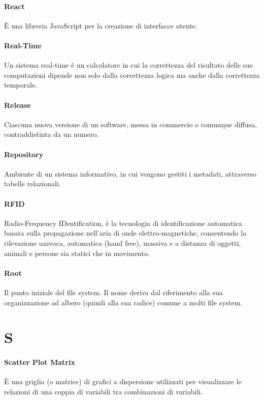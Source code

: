 \documentclass[]{article}
\begin{document}
	\paragraph*{React}
	È una libreria JavaScript per la creazione di interfacce utente.
	
	\paragraph*{Real-Time}
	Un sistema real-time è un calcolatore in cui la correttezza del risultato delle sue computazioni dipende non solo dalla correttezza logica ma anche dalla correttezza temporale.
	
	\paragraph*{Release}
	Ciascuna nuova versione di un software, messa in commercio o comunque diffusa, contraddistinta da un numero.
	
	\paragraph*{Repository}
	Ambiente di un sistema informativo, in cui vengono gestiti i metadati, attraverso tabelle relazionali.
	
	\paragraph*{RFID}
	Radio-Frequency IDentification, è la tecnologia di identificazione automatica basata sulla propagazione nell'aria di onde elettro-magnetiche, consentendo la rilevazione univoca, automatica (hand free), massiva e a distanza di oggetti, animali e persone sia statici che in movimento.
	
	\paragraph*{Root}
	Il punto iniziale del file system. Il nome deriva dal riferimento alla sua organizzazione ad albero (quindi alla sua radice) comune a molti file system.
		
	\newpage	
	
	\section*{S}
	
	\paragraph*{Scatter Plot Matrix}
	È una griglia (o matrice) di grafici a dispersione utilizzati per visualizzare le relazioni di una coppia di variabili tra combinazioni di variabili.
	
\end{document}
